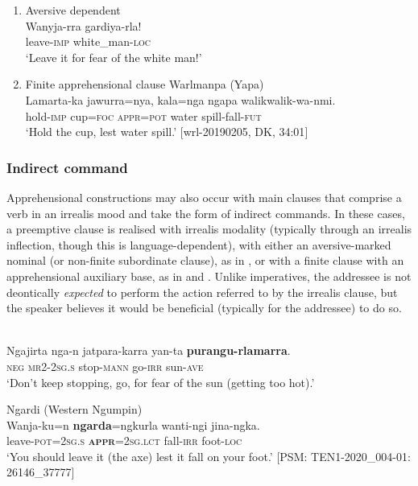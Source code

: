 \documentclass[output=paper,colorlinks,citecolor=brown]{langscibook}
\begin{document}
\newpage
\begin{enumerate}
    \item Aversive dependent
\ea 
{} \\
\gll Wanyja-rra gardiya-rla! \\
leave-\textsc{imp} white\_man-\textsc{loc} \\
\glt `Leave it for fear of the white man!' 
\label{ex:bro72}
\z

    \item Finite apprehensional clause
\ea 
\textnormal{Warlmanpa (Yapa)} \\
\gll Lamarta-ka jawurra=nya, kala=nga ngapa walikwalik-wa-nmi. \\
hold-\textsc{imp} cup=\textsc{foc} \textsc{appr=pot} water spill-fall-\textsc{fut} \\
\glt `Hold the cup, lest water spill.' $[$wrl-20190205, DK, 34:01$]$
\label{ex:bro73}
\z
\end{enumerate}

\subsubsection{Indirect command}

Apprehensional constructions may also occur with main clauses that comprise a verb in an irrealis mood and take the form of indirect commands. In these cases, a preemptive clause is realised with irrealis modality (typically through an irrealis inflection, though this is language-dependent), with either an aversive-marked nominal (or non-finite subordinate clause), as in , or with a finite clause with an apprehensional auxiliary base, as in  and . Unlike imperatives, the addressee is not deontically \textit{expected} to perform the action referred to by the irrealis clause, but the speaker believes it would be beneficial (typically for the addressee) to do so.


\ea
{} {\citealt{richards_interactive_2012}} \\
\gll Ngajirta nga-n jatpara-karra yan-ta \textbf{purangu-rlamarra}. \\
\textsc{neg} \textsc{mr2-2sg.s} stop-\textsc{mann} go-\textsc{irr} sun-\textsc{ave} \\
\glt `Don't keep stopping, go, for fear of the sun (getting too hot).'
\label{ex:bro74}
\z

\ea 
\textnormal{Ngardi (Western Ngumpin)} \\
\gll Wanja-ku=n \textbf{ngarda}=ngkurla wanti-ngi jina-ngka. \\
leave-\textsc{pot=2sg.s} \textsc{\textbf{appr}=2sg.lct} fall-\textsc{irr} foot-\textsc{loc} \\
\glt `You should leave it (the axe) lest it fall on your foot.' [PSM: TEN1-2020\_004-01: 26146\_37777]
\label{ex:bro75}
\z
\end{document}
